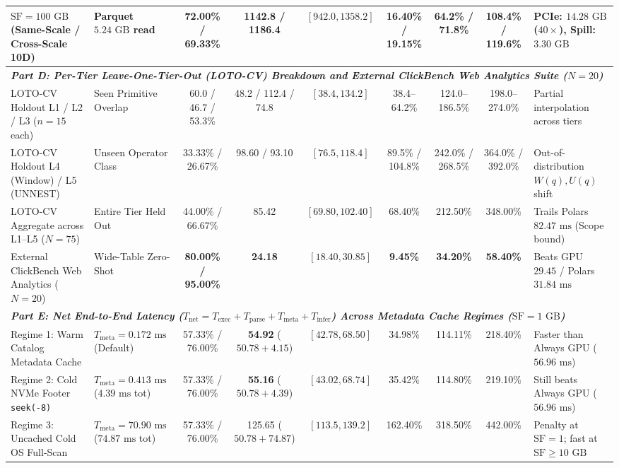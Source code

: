 \documentclass[10pt,a4paper]{article}
\newenvironment{fitasttable}{%
  \begin{lrbox}{\asttblbox}%
}{%
  \end{lrbox}%
  \sbox{\asttblboxB}{%
    \ifdim\wd\asttblbox>0.96\textwidth
      \resizebox{0.96\textwidth}{!}{\usebox{\asttblbox}}%
    \else
      \usebox{\asttblbox}%
    \fi
  }%
  \ifdim\ht\asttblboxB>0.72\textheight
    \resizebox{!}{0.72\textheight}{\usebox{\asttblboxB}}%
  \else
    \usebox{\asttblboxB}%
  \fi
}
\begin{document}
\begin{table}[t!]
\begin{fitasttable}
\begin{tabular}{@{}llccccccl@{}}
$\text{SF}=100\text{ GB}$ (Same-Scale / Cross-Scale 10D) & Parquet $5.24\text{ GB}$ read & 72.00\% / 69.33\% & 1142.8 / 1186.4 & $[942.0, 1358.2]$ & 16.40\% / 19.15\% & 64.2\% / 71.8\% & 108.4\% / 119.6\% & PCIe: $14.28\text{ GB}$ ($40\times$), Spill: $3.30\text{ GB}$ \\
\hline
\multicolumn{9}{l}{\textit{\textbf{Part D: Per-Tier Leave-One-Tier-Out (LOTO-CV) Breakdown and External ClickBench Web Analytics Suite ($N=20$)}}} \\
LOTO-CV Holdout L1 / L2 / L3 ($n=15$ each) & Seen Primitive Overlap & 60.0 / 46.7 / 53.3\% & 48.2 / 112.4 / 74.8 & $[38.4, 134.2]$ & 38.4--64.2\% & 124.0--186.5\% & 198.0--274.0\% & Partial interpolation across tiers \\
LOTO-CV Holdout L4 (Window) / L5 (UNNEST) & Unseen Operator Class & 33.33\% / 26.67\% & 98.60 / 93.10 & $[76.5, 118.4]$ & 89.5\% / 104.8\% & 242.0\% / 268.5\% & 364.0\% / 392.0\% & Out-of-distribution $W(q), U(q)$ shift \\
LOTO-CV Aggregate across L1--L5 ($N=75$) & Entire Tier Held Out & 44.00\% / 66.67\% & 85.42 & $[69.80, 102.40]$ & 68.40\% & 212.50\% & 348.00\% & Trails Polars $82.47\text{ ms}$ (Scope bound) \\
External ClickBench Web Analytics ($N=20$) & Wide-Table Zero-Shot & \textbf{80.00\% / 95.00\%} & \textbf{24.18} & $[18.40, 30.85]$ & \textbf{9.45\%} & \textbf{34.20\%} & \textbf{58.40\%} & Beats GPU $29.45$ / Polars $31.84\text{ ms}$ \\
\hline
\multicolumn{9}{l}{\textit{\textbf{Part E: Net End-to-End Latency ($T_{\text{net}} = T_{\text{exec}} + T_{\text{parse}} + T_{\text{meta}} + T_{\text{infer}}$) Across Metadata Cache Regimes ($\text{SF}=1\text{ GB}$)}}} \\
Regime 1: Warm Catalog Metadata Cache & $T_{\text{meta}}=0.172\text{ ms}$ (Default) & 57.33\% / 76.00\% & \textbf{54.92} ($50.78+4.15$) & $[42.78, 68.50]$ & 34.98\% & 114.11\% & 218.40\% & Faster than Always GPU ($56.96\text{ ms}$) \\
Regime 2: Cold NVMe Footer \texttt{seek(-8)} & $T_{\text{meta}}=0.413\text{ ms}$ ($4.39\text{ ms}$ tot) & 57.33\% / 76.00\% & \textbf{55.16} ($50.78+4.39$) & $[43.02, 68.74]$ & 35.42\% & 114.80\% & 219.10\% & Still beats Always GPU ($56.96\text{ ms}$) \\
Regime 3: Uncached Cold OS Full-Scan & $T_{\text{meta}}=70.90\text{ ms}$ ($74.87\text{ ms}$ tot) & 57.33\% / 76.00\% & 125.65 ($50.78+74.87$) & $[113.5, 139.2]$ & 162.40\% & 318.50\% & 442.00\% & Penalty at $\text{SF}=1$; fast at $\text{SF}\ge 10\text{ GB}$ \\
\hline
\end{tabular}
\end{fitasttable}%
\end{table}
\end{document}
